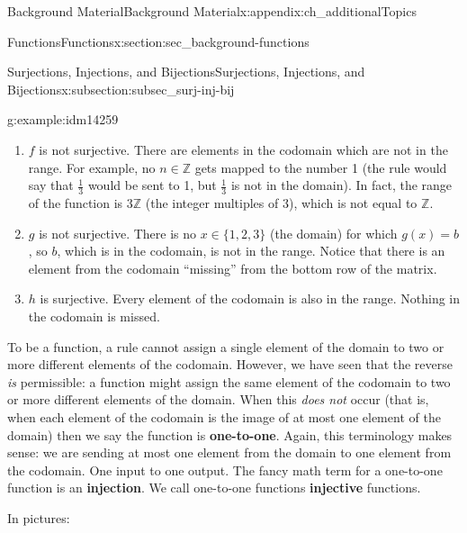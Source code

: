 \documentclass[oneside,10pt,]{book}
\newcommand{\terminology}[1]{\textbf{#1}}
\numberwithin{equation}{chapter}
\def\Z{\mathbb Z}
\begin{document}
\begin{appendixptx}{Background Material}{}{Background Material}{}{}{x:appendix:ch_additionalTopics}
\begin{sectionptx}{Functions}{}{Functions}{}{}{x:section:sec_background-functions}
\begin{subsectionptx}{Surjections, Injections, and Bijections}{}{Surjections, Injections, and Bijections}{}{}{x:subsection:subsec_surj-inj-bij}
\begin{example}{}{g:example:idm14259}
\begin{enumerate}
\item{}\(f\) is not surjective. There are elements in the codomain which are not in the range. For example, no \(n \in \Z\) gets mapped to the number 1 (the rule would say that \(\frac{1}{3}\) would be sent to 1, but \(\frac{1}{3}\) is not in the domain). In fact, the range of the function is \(3\Z\) (the integer multiples of 3), which is not equal to \(\Z\).%
\item{}\(g\) is not surjective. There is no \(x \in \{1,2,3\}\) (the domain) for which \(g(x) = b\), so \(b\), which is in the codomain, is not in the range. Notice that there is an element from the codomain ``missing'' from the bottom row of the matrix.%
\item{}\(h\) is surjective. Every element of the codomain is also in the range. Nothing in the codomain is missed.%
\end{enumerate}
%
\end{example}
To be a function, a rule cannot assign a single element of the domain to two or more different elements of the codomain. However, we have seen that the reverse \emph{is} permissible: a function might assign the same element of the codomain to two or more different elements of the domain. When this \emph{does not} occur (that is, when each element of the codomain is the image of at most one element of the domain) then we say the function is \terminology{one-to-one}. Again, this terminology makes sense: we are sending at most one element from the domain to one element from the codomain. One input to one output. The fancy math term for a one-to-one function is an \terminology{injection}. We call one-to-one functions \terminology{injective} functions.%
\par
In pictures:%
\begin{sidebyside}{2}{0.05}{0.05}{0.1}%
\begin{sbspanel}{0.4}%
%
\end{sbspanel}%

\end{sidebyside}
\end{subsectionptx}
\end{sectionptx}
\end{appendixptx}
\end{document}

